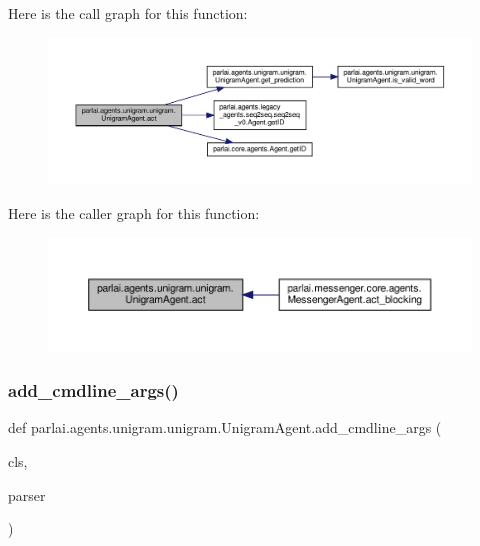 Here is the call graph for this function\+:
\nopagebreak
\begin{figure}[H]
\begin{center}
\leavevmode
\includegraphics[width=350pt]{classparlai_1_1agents_1_1unigram_1_1unigram_1_1UnigramAgent_a525621d38b382d27fad882ca4a8c682a_cgraph}
\end{center}
\end{figure}
Here is the caller graph for this function\+:
\nopagebreak
\begin{figure}[H]
\begin{center}
\leavevmode
\includegraphics[width=350pt]{classparlai_1_1agents_1_1unigram_1_1unigram_1_1UnigramAgent_a525621d38b382d27fad882ca4a8c682a_icgraph}
\end{center}
\end{figure}
\mbox{\label{classparlai_1_1agents_1_1unigram_1_1unigram_1_1UnigramAgent_a975b292cb31540e198a220d3c9bd7ea5}} 
\subsubsection{\texorpdfstring{add\+\_\+cmdline\+\_\+args()}{add\_cmdline\_args()}}
{\footnotesize\ttfamily def parlai.\+agents.\+unigram.\+unigram.\+Unigram\+Agent.\+add\+\_\+cmdline\+\_\+args (\begin{DoxyParamCaption}\item[{}]{cls,  }\item[{}]{parser }\end{DoxyParamCaption})}

